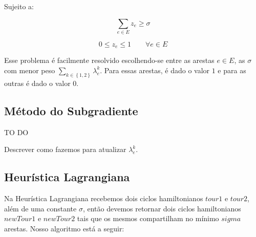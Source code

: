 \documentclass{article}
\newcommand{\Set}[1]{\ensuremath{\left\{#1\right\}}}
\newcommand{\Sum}[1]{\ensuremath{\displaystyle\sum\limits_{#1}}}
\newcommand{\edge}{\ensuremath{e}}
\newcommand{\edges}{\ensuremath{E}}
\newcommand{\ncycles}{2}
\newcommand{\allCycles}{\ensuremath{\Set{1, \ncycles}}}
\newcommand{\cycle}{\ensuremath{k}}
\newcommand{\ze}{\ensuremath{z_{\edge}}}
\newcommand{\similarity}{\ensuremath{\sigma}}
\newcommand{\lagrange}{\ensuremath{\lambda}}
\newcommand{\lagrangeke}{\ensuremath{\lagrange_{\edge}^{\cycle}}}
\begin{document}
Sujeito a:

\begin{equation}
	\Sum{\edge \in \edges} \ze \geqslant \similarity
\end{equation}

\begin{equation}
	\label{constraint:value of ze}
	0 \leqslant \ze \leqslant 1
	\qquad
	\forall \edge \in \edges
\end{equation}

Esse problema é facilmente resolvido escolhendo-se entre as arestas $\edge \in \edges$, as $\similarity$ com menor peso $\Sum{\cycle \in \allCycles} \lagrangeke$. Para essas arestas, é dado o valor $1$ e para as outras é dado o valor $0$.

\subsection{Método do Subgradiente}

{\huge TO DO}

Descrever como fazemos para atualizar $\lagrangeke$.

\subsection{Heurística Lagrangiana}
Na Heurística Lagrangiana recebemos dois ciclos hamiltonianos $tour1$ e $tour2$, além de uma constante $\sigma$, então devemos retornar dois ciclos hamiltonianos $newTour1$ e $newTour2$ tais que os mesmos compartilham no mínimo $sigma$ arestas. Nosso algoritmo está a seguir:
\end{document}
